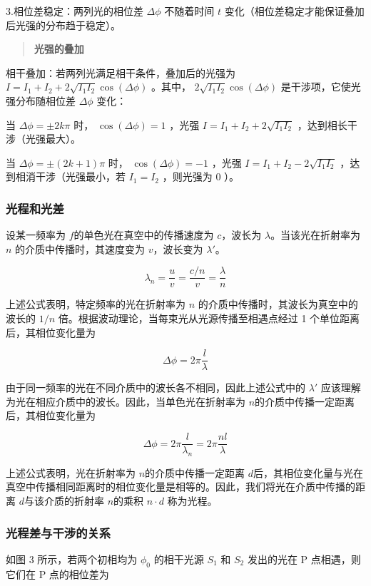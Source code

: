 \documentclass[withoutpreface,bwprint]{cumcmthesis} %
\begin{document}
3.相位差稳定：两列光的相位差 $\Delta \phi$ 不随着时间 $t$ 变化（相位差稳定才能保证叠加后光强的分布趋于稳定）。

\begin{quote}
    \textbf{光强的叠加}
\end{quote}

相干叠加：若两列光满足相干条件，叠加后的光强为 $I = I_1 + I_2 + 2 \sqrt{I_1 I_2} \cos(\Delta \phi)$ 。其中， $2 \sqrt{I_1 I_2} \cos(\Delta \phi)$ 是干涉项，它使光强分布随相位差 $\Delta \phi$ 变化：

当 $\Delta \phi = \pm 2k\pi$ 时， $\cos(\Delta \phi) = 1$ ，光强 $I = I_1 + I_2 + 2 \sqrt{I_1 I_2}$ ，达到相长干涉（光强最大）。

当 $\Delta \phi = \pm (2k+1)\pi$ 时， $\cos(\Delta \phi) = -1$ ，光强 $I = I_1 + I_2 - 2 \sqrt{I_1 I_2}$ ，达到相消干涉（光强最小，若 $I_1 = I_2$ ，则光强为 $0$ ）。

\subsubsection{光程和光差}
设某一频率为 $f$的单色光在真空中的传播速度为 $c$，波长为 $\lambda$。当该光在折射率为 $n$ 的介质中传播时，其速度变为 $v$，波长变为 $\lambda'$。

\[\lambda_{n} = \frac{u}{v} = \frac{c/n}{v} = \frac{\lambda}{n}\]

上述公式表明，特定频率的光在折射率为 $n$ 的介质中传播时，其波长为真空中的波长的 $1/n$ 倍。根据波动理论，当每束光从光源传播至相遇点经过 1 个单位距离后，其相位变化量为


\[\Delta\phi = 2\pi\frac{l}{\lambda}\]

由于同一频率的光在不同介质中的波长各不相同，因此上述公式中的 $\lambda'$ 应该理解为光在相应介质中的波长。因此，当单色光在折射率为 $n$的介质中传播一定距离后，其相位变化量为

\[\Delta\phi = 2\pi\frac{l}{\lambda_{n}} = 2\pi\frac{nl}{\lambda}\]


上述公式表明，光在折射率为 $n$的介质中传播一定距离 $d$后，其相位变化量与光在真空中传播相同距离时的相位变化量是相等的。因此，我们将光在介质中传播的距离 $d$与该介质的折射率 $n$的乘积 $n\cdot d$ 称为光程。

\subsubsection{光程差与干涉的关系}

如图 3 所示，若两个初相均为 $\phi_0$ 的相干光源 $S_1$ 和 $S_2$ 发出的光在 P 点相遇，则它们在 P 点的相位差为
\end{document}

